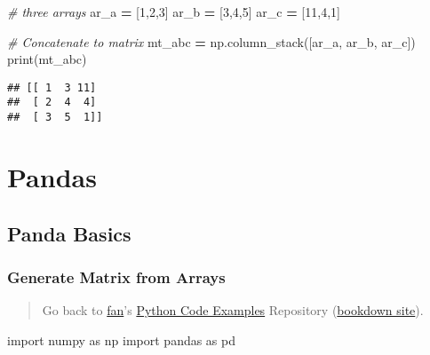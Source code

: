 \documentclass[
]{book}
\newenvironment{Shaded}{\begin{snugshade}}{\end{snugshade}}
\newcommand{\BuiltInTok}[1]{#1}
\newcommand{\CommentTok}[1]{\textcolor[rgb]{0.56,0.35,0.01}{\textit{#1}}}
\newcommand{\DecValTok}[1]{\textcolor[rgb]{0.00,0.00,0.81}{#1}}
\newcommand{\ImportTok}[1]{#1}
\newcommand{\NormalTok}[1]{#1}
\newcommand{\OperatorTok}[1]{\textcolor[rgb]{0.81,0.36,0.00}{\textbf{#1}}}
\begin{document}
\begin{Shaded}
\begin{Highlighting}[]
\CommentTok{# three arrays}
\NormalTok{ar_a }\OperatorTok{=}\NormalTok{ [}\DecValTok{1}\NormalTok{,}\DecValTok{2}\NormalTok{,}\DecValTok{3}\NormalTok{]}
\NormalTok{ar_b }\OperatorTok{=}\NormalTok{ [}\DecValTok{3}\NormalTok{,}\DecValTok{4}\NormalTok{,}\DecValTok{5}\NormalTok{]}
\NormalTok{ar_c }\OperatorTok{=}\NormalTok{ [}\DecValTok{11}\NormalTok{,}\DecValTok{4}\NormalTok{,}\DecValTok{1}\NormalTok{]}

\CommentTok{# Concatenate to matrix}
\NormalTok{mt_abc }\OperatorTok{=}\NormalTok{ np.column_stack([ar_a, ar_b, ar_c])}
\BuiltInTok{print}\NormalTok{(mt_abc)}
\end{Highlighting}
\end{Shaded}

\begin{verbatim}
## [[ 1  3 11]
##  [ 2  4  4]
##  [ 3  5  1]]
\end{verbatim}

\hypertarget{pandas}{%
\chapter{Pandas}\label{pandas}}

\hypertarget{panda-basics}{%
\section{Panda Basics}\label{panda-basics}}

\hypertarget{generate-matrix-from-arrays-1}{%
\subsection{Generate Matrix from Arrays}\label{generate-matrix-from-arrays-1}}

\begin{quote}
Go back to \href{http://fanwangecon.github.io/}{fan}'s \href{https://fanwangecon.github.io/pyfan/}{Python Code Examples} Repository (\href{https://fanwangecon.github.io/pyfan/bookdown}{bookdown site}).
\end{quote}

\begin{Shaded}
\begin{Highlighting}[]
\ImportTok{import}\NormalTok{ numpy }\ImportTok{as}\NormalTok{ np}
\ImportTok{import}\NormalTok{ pandas }\ImportTok{as}\NormalTok{ pd}
\end{Highlighting}
\end{Shaded}
\end{document}
